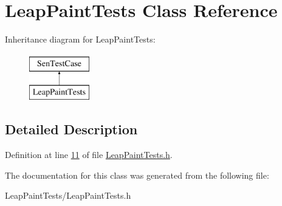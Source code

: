 \hypertarget{interface_leap_paint_tests}{\section{Leap\-Paint\-Tests Class Reference}
\label{d6/d93/interface_leap_paint_tests}
}
Inheritance diagram for Leap\-Paint\-Tests\-:\begin{figure}[H]
\begin{center}
\leavevmode
\includegraphics[height=2.000000cm]{d6/d93/interface_leap_paint_tests}
\end{center}
\end{figure}


\subsection{Detailed Description}


Definition at line \hyperlink{_leap_paint_tests_8h_source_l00011}{11} of file \hyperlink{_leap_paint_tests_8h_source}{Leap\-Paint\-Tests.\-h}.



The documentation for this class was generated from the following file\-:\begin{DoxyCompactItemize}
\item 
Leap\-Paint\-Tests/Leap\-Paint\-Tests.\-h\end{DoxyCompactItemize}
